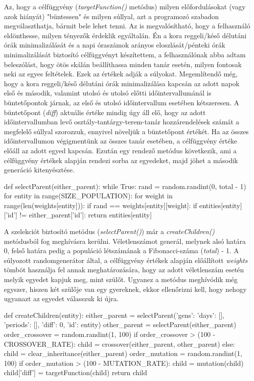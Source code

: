 \documentclass[a4paper,12pt]{article}
\begin{document}
Az, hogy a célfüggvény (\textsl{targetFunction()} metódus) milyen előfordulásokat (vagy azok hiányát) "büntessen" és milyen súllyal, azt a programozó szabadon megválaszthatja, bármit bele lehet tenni. Az is megvalósítható, hogy a felhasználó eldönthesse, milyen tényezők érdeklik egyáltalán. Én a kora reggeli/késő délutáni órák minimalizálását és a napi óraszámok arányos eloszlását/pénteki órák minimalizálását biztosító célfüggvényt készítettem, a felhasználónak abba adtam beleszólást, hogy ötös skálán beállíthassa minden tanár esetén, milyen fontosak neki az egyes feltételek. Ezek az értékek adják a súlyokat. Megemlítendő még, hogy a kora reggeli/késő délutáni órák minimalizálása kapcsán az adott napok első és második, valamint utolsó és utolsó előtti időintervallumánál is büntetőpontok járnak, az első és utolsó időintervallum esetében kétszeresen. A büntetőpont (\textsl{diff}) aktuális értéke mindig úgy áll elő, hogy az adott időintervallumban levő osztály-tantárgy-terem-tanár hozzárendelések számát a megfelelő súllyal szorozzuk, ennyivel növeljük a büntetőpont értékét. Ha az összes időintervallumon végigmentünk az összes tanár esetében, a célfüggvény értéke előáll az adott egyed kapcsán. Ezután egy rendező metódus következik, ami a célfüggvény értékek alapján rendezi sorba az egyedeket, majd jöhet a második generáció kitenyésztése.

\begin{python}
def selectParent(either_parent):
    while True:
        rand = random.randint(0, total - 1)
        for entity in range(SIZE_POPULATION):
            for weight in range(len(weights[entity])):
                if rand == weights[entity][weight]:
                    if entities[entity]['id'] != either_parent['id']:
                        return entities[entity]
\end{python}

A szelekciót biztosító metódus (\textsl{selectParent()}) már a \textsl{createChildren()} metódusból fog meghívásra kerülni. Véletlenszámot generál, melynek alsó határa 0, felső határa pedig a populáció létszámának a Fibonacci-száma (\textsl{total}) - 1. A súlyozott randomgenerátor által, a célfüggvény értékek alapján előállított \textsl{weights} tömböt használja fel annak meghatározására, hogy az adott véletlenszám esetén melyik egyedet kapjuk meg, mint szülőt. Ugyanez a metódus meghívódik még egyszer, hiszen két szülője van egy gyereknek, ekkor ellenőrizni kell, hogy nehogy ugyanazt az egyedet válasszuk ki újra.

\begin{python}
def createChildren(entity):
    either_parent = selectParent({'gens': {'days': [], 'periods': []}, 'diff': 0, 'id': entity})
    other_parent = selectParent(either_parent)
    order_crossover = random.randint(1, 100)
    if order_crossover > (100 - CROSSOVER_RATE):
        child = crossover(either_parent, other_parent)
    else:
        child = clear_inheritance(either_parent)
    order_mutation = random.randint(1, 100)
    if order_mutation > (100 - MUTATION_RATE):
        child = mutation(child)
    child['diff'] = targetFunction(child)
    return child
\end{python}
\end{document}
